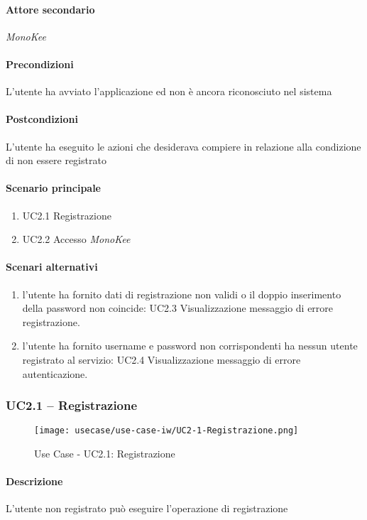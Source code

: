 \paragraph{Attore secondario}  \textit{MonoKee}
\paragraph{Precondizioni}  L’utente ha avviato l’applicazione ed non è ancora riconosciuto nel sistema
\paragraph{Postcondizioni}  L’utente ha eseguito le azioni che desiderava compiere in relazione alla condizione di non essere registrato
\paragraph{Scenario principale}  
    \begin{enumerate}
        \item UC2.1 Registrazione
        \item UC2.2 Accesso \textit{MonoKee}
    \end{enumerate}
\paragraph{Scenari alternativi}  
    \begin{enumerate}
        \item l’utente ha fornito dati di registrazione non validi o il doppio inserimento della password non coincide: UC2.3 Visualizzazione messaggio di errore registrazione.
        \item l’utente ha fornito username e password non corrispondenti ha nessun utente registrato al servizio: UC2.4 Visualizzazione messaggio di errore autenticazione.
    \end{enumerate}


\subsubsection{UC2.1 – Registrazione}
\begin{figure}[!htbp] 
    \centering 
    \texttt{[image: usecase/use-case-iw/UC2-1-Registrazione.png]} 
    \caption{Use Case - UC2.1: Registrazione}
\end{figure}

\paragraph{Descrizione}  L’utente non registrato può eseguire l’operazione di registrazione 
